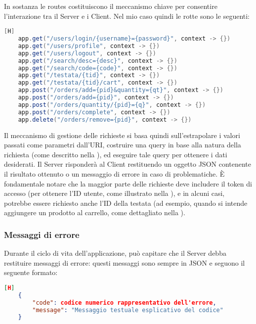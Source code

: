 \noindent
In sostanza le routes costituiscono il meccanismo chiave per consentire l'interazione tra il Server e i Client.
Nel mio caso quindi le rotte sono le seguenti:
\begin{lstlisting}[language=Java, firstnumber=5][H]
	app.get("/users/login/{username}={password}", context -> {})
	app.get("/users/profile", context -> {})
	app.get("/users/logout", context -> {})
	app.get("/search/desc={desc}", context -> {})
	app.get("/search/code={code}", context -> {})
	app.get("/testata/{tid}", context -> {})
	app.get("/testata/{tid}/cart", context -> {})
	app.post("/orders/add={pid}&quantity={qt}", context -> {})
	app.post("/orders/add={pid}", context -> {})
	app.post("/orders/quantity/{pid}={q}", context -> {})
	app.post("/orders/complete", context -> {})
	app.delete("/orders/remove={pid}", context -> {})
\end{lstlisting}
\noindent
Il meccanismo di gestione delle richieste si basa quindi sull'estrapolare i valori passati come parametri dall'URI, costruire una query in base alla natura della richiesta (come descritto nella ), ed eseguire tale query per ottenere i dati desiderati. Il Server risponderà al Client restituendo un oggetto JSON contenente il risultato ottenuto o un messaggio di errore in caso di problematiche.
È fondamentale notare che la maggior parte delle richieste deve includere il token di accesso (per ottenere l'ID utente, come illustrato nella ), e in alcuni casi, potrebbe essere richiesto anche l'ID della testata (ad esempio, quando si intende aggiungere un prodotto al carrello, come dettagliato nella ).

\subsubsection{Messaggi di errore}
Durante il ciclo di vita dell'applicazione, può capitare che il Server debba restituire messaggi di errore: questi messaggi sono sempre in JSON e seguono il seguente formato:
\begin{lstlisting}[language=JSON, firstnumber=1][H]
	{
		"code": codice numerico rappresentativo dell'errore,
		"message": "Messaggio testuale esplicativo del codice"
	}
\end{lstlisting}